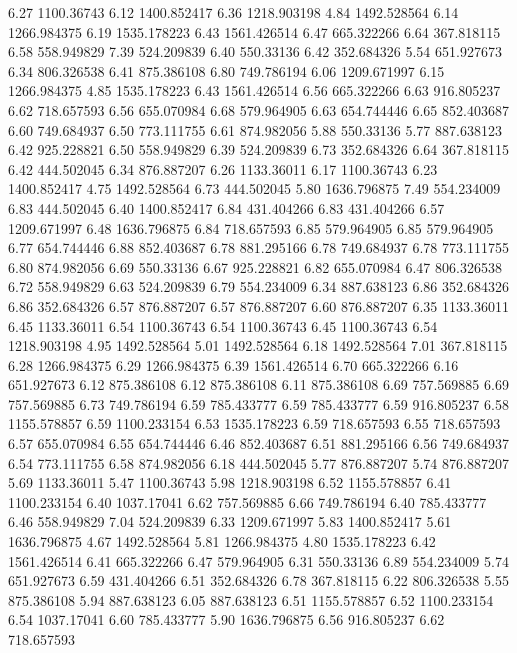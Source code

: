 6.27 	1100.36743
6.12 	1400.852417
6.36 	1218.903198
4.84 	1492.528564
6.14 	1266.984375
6.19 	1535.178223
6.43 	1561.426514
6.47 	665.322266
6.64 	367.818115
6.58 	558.949829
7.39 	524.209839
6.40 	550.33136
6.42 	352.684326
5.54 	651.927673
6.34 	806.326538
6.41 	875.386108
6.80 	749.786194
6.06 	1209.671997
6.15 	1266.984375
4.85 	1535.178223
6.43 	1561.426514
6.56 	665.322266
6.63 	916.805237
6.62 	718.657593
6.56 	655.070984
6.68 	579.964905
6.63 	654.744446
6.65 	852.403687
6.60 	749.684937
6.50 	773.111755
6.61 	874.982056
5.88 	550.33136
5.77 	887.638123
6.42 	925.228821
6.50 	558.949829
6.39 	524.209839
6.73 	352.684326
6.64 	367.818115
6.42 	444.502045
6.34 	876.887207
6.26 	1133.36011
6.17 	1100.36743
6.23 	1400.852417
4.75 	1492.528564
6.73 	444.502045
5.80 	1636.796875
7.49 	554.234009
6.83 	444.502045
6.40 	1400.852417
6.84 	431.404266
6.83 	431.404266
6.57 	1209.671997
6.48 	1636.796875
6.84 	718.657593
6.85 	579.964905
6.85 	579.964905
6.77 	654.744446
6.88 	852.403687
6.78 	881.295166
6.78 	749.684937
6.78 	773.111755
6.80 	874.982056
6.69 	550.33136
6.67 	925.228821
6.82 	655.070984
6.47 	806.326538
6.72 	558.949829
6.63 	524.209839
6.79 	554.234009
6.34 	887.638123
6.86 	352.684326
6.86 	352.684326
6.57 	876.887207
6.57 	876.887207
6.60 	876.887207
6.35 	1133.36011
6.45 	1133.36011
6.54 	1100.36743
6.54 	1100.36743
6.45 	1100.36743
6.54 	1218.903198
4.95 	1492.528564
5.01 	1492.528564
6.18 	1492.528564
7.01 	367.818115
6.28 	1266.984375
6.29 	1266.984375
6.39 	1561.426514
6.70 	665.322266
6.16 	651.927673
6.12 	875.386108
6.12 	875.386108
6.11 	875.386108
6.69 	757.569885
6.69 	757.569885
6.73 	749.786194
6.59 	785.433777
6.59 	785.433777
6.59 	916.805237
6.58 	1155.578857
6.59 	1100.233154
6.53 	1535.178223
6.59 	718.657593
6.55 	718.657593
6.57 	655.070984
6.55 	654.744446
6.46 	852.403687
6.51 	881.295166
6.56 	749.684937
6.54 	773.111755
6.58 	874.982056
6.18 	444.502045
5.77 	876.887207
5.74 	876.887207
5.69 	1133.36011
5.47 	1100.36743
5.98 	1218.903198
6.52 	1155.578857
6.41 	1100.233154
6.40 	1037.17041
6.62 	757.569885
6.66 	749.786194
6.40 	785.433777
6.46 	558.949829
7.04 	524.209839
6.33 	1209.671997
5.83 	1400.852417
5.61 	1636.796875
4.67 	1492.528564
5.81 	1266.984375
4.80 	1535.178223
6.42 	1561.426514
6.41 	665.322266
6.47 	579.964905
6.31 	550.33136
6.89 	554.234009
5.74 	651.927673
6.59 	431.404266
6.51 	352.684326
6.78 	367.818115
6.22 	806.326538
5.55 	875.386108
5.94 	887.638123
6.05 	887.638123
6.51 	1155.578857
6.52 	1100.233154
6.54 	1037.17041
6.60 	785.433777
5.90 	1636.796875
6.56 	916.805237
6.62 	718.657593
